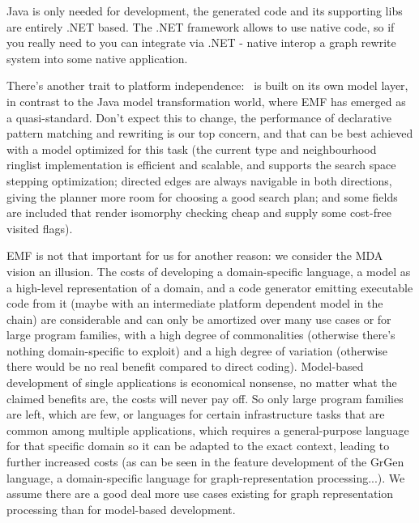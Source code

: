 Java is only needed for development, the generated code and its supporting libs are entirely .NET based.
The .NET framework allows to use native code, so if you really need to you can integrate via .NET - native interop a graph rewrite system into some native application.

There's another trait to platform independence: \GrG\ is built on its own model layer, in contrast to the Java model transformation world, where EMF has emerged as a quasi-standard.
Don't expect this to change, the performance of declarative pattern matching and rewriting is our top concern, and that can be best achieved with a model optimized for this task (the current type and neighbourhood ringlist implementation is efficient and scalable, and supports the search space stepping optimization; directed edges are always navigable in both directions, giving the planner more room for choosing a good search plan; and some fields are included that render isomorphy checking cheap and supply some cost-free visited flags).

EMF is not that important for us for another reason: we consider the MDA vision an illusion.
The costs of developing a domain-specific language, a model as a high-level representation of a domain, and a code generator emitting executable code from it (maybe with an intermediate platform dependent model in the chain) are considerable and can only be amortized over many use cases or for large program families, with a high degree of commonalities (otherwise there's nothing domain-specific to exploit) and a high degree of variation (otherwise there would be no real benefit compared to direct coding).
Model-based development of single applications is economical nonsense, no matter what the claimed benefits are, the costs will never pay off.
So only large program families are left, which are few, or languages for certain infrastructure tasks that are common among multiple applications, which requires a general-purpose language for that specific domain so it can be adapted to the exact context, leading to further increased costs (as can be seen in the feature development of the GrGen language, a domain-specific language for graph-representation processing...).
We assume there are a good deal more use cases existing for graph representation processing than for model-based development.

